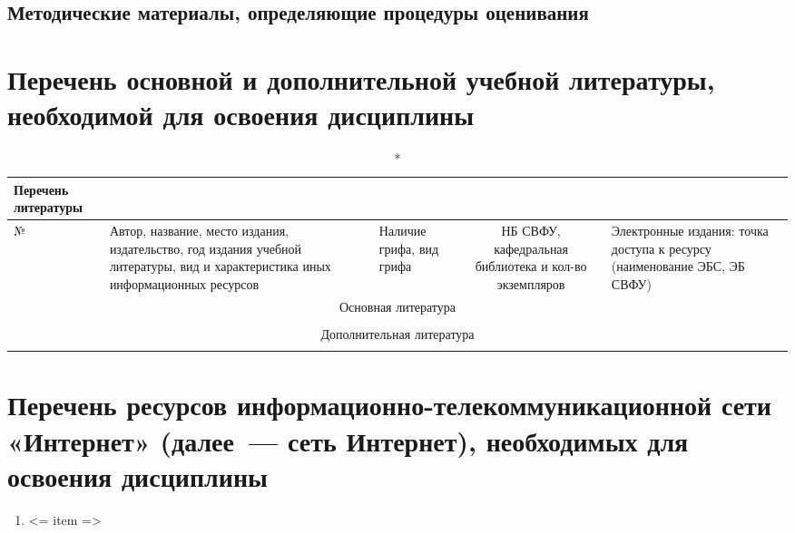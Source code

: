 \documentclass[a4paper,12pt]{article}
\begin{document}
\subsection{Методические материалы, определяющие процедуры оценивания}



\newpage
\section{Перечень основной и дополнительной учебной литературы, необходимой для освоения дисциплины}

  \begin{longtable}{|l|p{7cm}|p{18mm}|c|p{32mm}|}
  \caption*{Перечень литературы}\\
  \hline
  № & 
  \centering\small\arraybackslash Автор, название, место издания, издательство, год издания учебной литературы, вид и характеристика иных информационных ресурсов &
  \multicolumn{1}{p{18mm}|}{\centering\small\arraybackslash Наличие грифа, вид грифа} &
  \multicolumn{1}{p{21mm}|}{\centering\small\arraybackslash НБ СВФУ, кафедральная библиотека и кол-во экземпляров} & 
  \centering\small\arraybackslash Электронные издания: точка доступа к ресурсу (наименование ЭБС, ЭБ СВФУ)\\
  \hline
  \multicolumn{5}{|c|}{Основная литература}\\
  \hline
  \\
  \hline
  \multicolumn{5}{|c|}{Дополнительная литература}\\
  \hline
  \\
  \hline
  \end{longtable}
  
\section{Перечень ресурсов информационно-телекоммуникационной сети «Интернет» (далее~--- сеть Интернет), необходимых для освоения дисциплины}
\begin{enumerate}
  \raggedright
  \item <= item => 
\end{enumerate}
\end{document}
